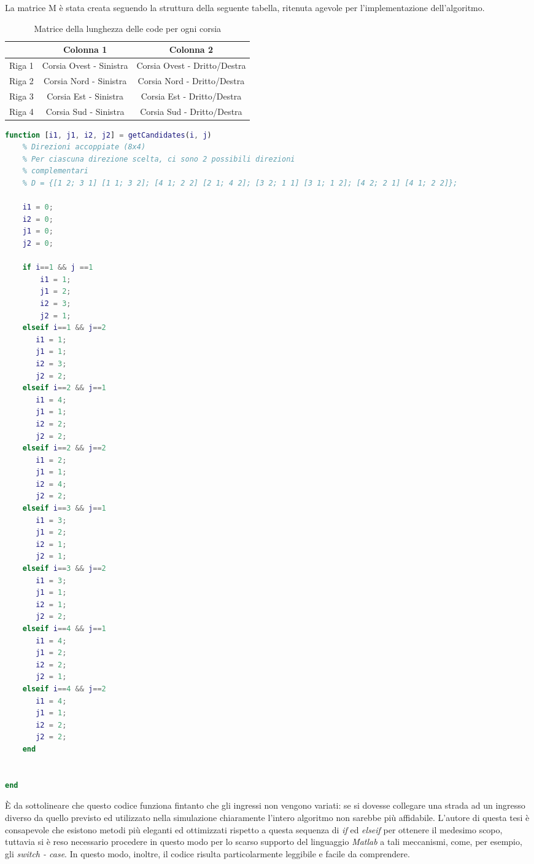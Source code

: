 La matrice M è stata creata seguendo la struttura della seguente tabella, ritenuta agevole per l'implementazione dell'algoritmo.
\newline
\begin{table}[H]
\centering
\begin{tabular}{|c|c|c|}
  \hline
  & 
  \textbf{Colonna 1} & 
  \textbf{Colonna 2} \\\hline
  Riga 1 & 
  Corsia Ovest - Sinistra & 
  Corsia Ovest - Dritto/Destra \\\hline
  Riga 2 & 
  Corsia Nord - Sinistra & 
  Corsia Nord - Dritto/Destra \\\hline
  Riga 3 & 
  Corsia Est - Sinistra & 
  Corsia Est - Dritto/Destra \\\hline
  Riga 4 & 
  Corsia Sud - Sinistra & 
  Corsia Sud - Dritto/Destra \\\hline
\end{tabular}
\caption{Matrice della lunghezza delle code per ogni corsia}
\label{table:matrix-length-corsia}
\end{table}

\newpage
\begin{lstlisting}[language=Matlab,label=key,caption=Scelta delle due strade complementari a quella selezionata come principale]
    function [i1, j1, i2, j2] = getCandidates(i, j)
    % Direzioni accoppiate (8x4)
    % Per ciascuna direzione scelta, ci sono 2 possibili direzioni
    % complementari
    % D = {[1 2; 3 1] [1 1; 3 2]; [4 1; 2 2] [2 1; 4 2]; [3 2; 1 1] [3 1; 1 2]; [4 2; 2 1] [4 1; 2 2]};
    
    i1 = 0;
    i2 = 0;
    j1 = 0;
    j2 = 0;
    
    if i==1 && j ==1
        i1 = 1;
        j1 = 2;
        i2 = 3;
        j2 = 1;
    elseif i==1 && j==2
       i1 = 1;
       j1 = 1;
       i2 = 3;
       j2 = 2;
    elseif i==2 && j==1
       i1 = 4;
       j1 = 1;
       i2 = 2;
       j2 = 2;
    elseif i==2 && j==2
       i1 = 2;
       j1 = 1;
       i2 = 4;
       j2 = 2;
    elseif i==3 && j==1
       i1 = 3;
       j1 = 2;
       i2 = 1;
       j2 = 1;
    elseif i==3 && j==2
       i1 = 3;
       j1 = 1;
       i2 = 1;
       j2 = 2;
    elseif i==4 && j==1
       i1 = 4;
       j1 = 2;
       i2 = 2;
       j2 = 1;
    elseif i==4 && j==2
       i1 = 4;
       j1 = 1;
       i2 = 2;
       j2 = 2;
    end
            
        
end
\end{lstlisting}

È da sottolineare che questo codice funziona fintanto che gli ingressi non vengono variati: se si dovesse collegare una strada ad un ingresso diverso da quello previsto ed utilizzato nella simulazione chiaramente l’intero algoritmo non sarebbe più affidabile. L'autore di questa tesi è consapevole che esistono metodi più eleganti ed ottimizzati rispetto a questa sequenza di \textit{if} ed \textit{elseif} per ottenere il medesimo scopo, tuttavia si è reso necessario procedere in questo modo per lo scarso supporto del linguaggio \textit{Matlab} a tali meccanismi, come, per esempio, gli \textit{switch - case}. In questo modo, inoltre, il codice risulta particolarmente leggibile e facile da comprendere.
\newline


